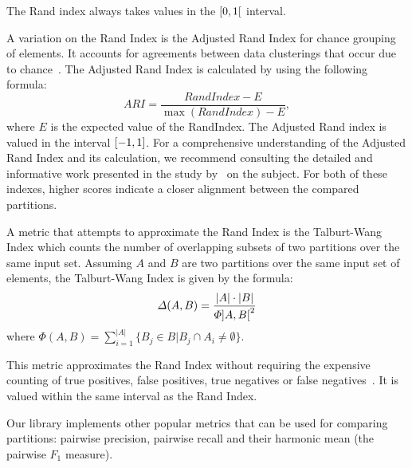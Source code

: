 \documentclass[a4paper,twoside]{article}
\begin{document}
    The Rand index always takes values in the $\rinterval{0}{1}$ interval.

    A variation on the Rand Index is the Adjusted Rand Index for chance grouping
    of elements.
    It accounts for agreements between data clusterings that occur due to
    chance~\cite{adjrand2001}.
    The Adjusted Rand Index is calculated by using the following formula:
    \begin{equation}
        ARI = \frac{RandIndex - E}{\max(RandIndex) - E},
    \end{equation}
    \noindent
    where $E$ is the expected value of the RandIndex.
    The Adjusted Rand index is valued in the interval $\interval{-1}{1}$.
    For a comprehensive understanding of the Adjusted Rand Index and its
    calculation, we recommend consulting the detailed and informative work
    presented in the study by~\cite{warrens2022understanding} on the subject. 
    For both of these indexes, higher scores indicate a closer alignment between
    the compared partitions.

    A metric that attempts to approximate the Rand Index is the Talburt-Wang
    Index which counts the number of overlapping subsets of two partitions over
    the same input set.
    Assuming $A$ and $B$ are two partitions over the same input set of elements,
    the Talburt-Wang Index is given by the formula:
    \begin{equation}
        \varDelta(A, B) = \frac{|A|\cdot|B|}{\varPhi{\ointerval{A}{B}}^2}
    \end{equation}
    \noindent 
    where $\varPhi(A, B) = \sum_{i=1}^{|A|}\{B_j \in B | B_j \cap A_i \neq \emptyset \}$.

    This metric approximates the Rand Index without requiring the expensive
    counting of true positives, false positives, true negatives or false
    negatives~\cite{tal2007algebraic}.
    It is valued within the same interval as the Rand Index.
    
    Our library implements other popular metrics that can be used for comparing
    partitions: pairwise precision, pairwise recall and their harmonic
    mean (the pairwise $F_1$ measure)\cite{hitesh2012}.
    
\end{document}
